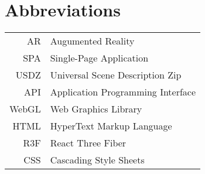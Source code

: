 \documentclass[english,bachelor,unicode,oneside,bw]{ctufit-thesis}
\begin{document}
% 
% 
% 
% 
% 
% 
% 
% 
% 

\chapter{Abbreviations}
	
\begin{tabular}{rl}
AR & Augumented Reality\\
SPA & Single-Page Application\\
USDZ & Universal Scene Description Zip\\
API & Application Programming Interface\\
WebGL & Web Graphics Library\\
HTML & HyperText Markup Language\\
R3F & React Three Fiber\\
CSS & Cascading Style Sheets\\
\end{tabular}
\end{document}
